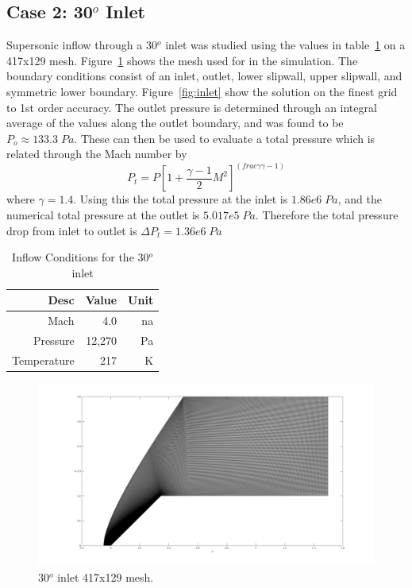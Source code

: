 \documentclass[]{aiaa-tc}%
\begin{document}
\subsection{Case 2: 30$^o$ Inlet}
Supersonic inflow through a 30$^o$ inlet was studied using the values in table~\ref{tbl:inlet} on a 417x129 mesh. Figure~\ref{fig:inletmesh} shows the mesh used for in the simulation. The boundary conditions consist of an inlet, outlet, lower slipwall, upper slipwall, and symmetric lower boundary. Figure~\ref{fig:inlet} show the solution on the finest grid to 1st order accuracy. The outlet pressure is determined through an integral average of the values along the outlet boundary, and was found to be $P_{o}\approx133.3\; Pa$. These can then be used to evaluate a total pressure which is related through the Mach number by 
\begin{equation}\label{eq:totalp}
  P_t = P\left[1+\frac{\gamma - 1}{2}M^2\right]^{\left(frac{\gamma}{\gamma - 1}\right)}
\end{equation}
where $\gamma = 1.4$. Using this the total pressure at the inlet is $1.86e6\;Pa$, and the numerical total pressure at the outlet is $5.017e5\;Pa$. Therefore the total pressure drop from inlet to outlet is $\Delta P_t=1.36e6\;Pa$

\begin{table}%
  \begin{center}
    \caption{Inflow Conditions for the 30$^o$ inlet}
    \label{tbl:inlet}
    \begin{tabular}{rrr}
      Desc & Value & Unit \\\hline
      Mach &  4.0 & na \\
      Pressure &  12,270 & Pa \\
      Temperature & 217 & K
    \end{tabular}
  \end{center}
\end{table}

\begin{figure}[!htb]
  \centering
  \includegraphics[width=0.5\linewidth]{figures/InletMesh4}
  \caption{ 30$^o$ inlet 417x129 mesh.}
  \label{fig:inletmesh}
\end{figure}
\end{document}
